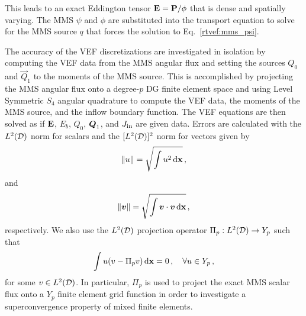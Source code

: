 \documentclass[../doc.tex]{subfiles}
\begin{document}
This leads to an exact Eddington tensor $\boldsymbol{\mathrm{E}} = \boldsymbol{\mathrm{P}}/\phi$ that is dense and spatially varying. The MMS $\psi$ and $\phi$ are substituted into the transport equation to solve for the MMS source $q$ that forces the solution to Eq.~\ref{rtvef:mms_psi}. 

The accuracy of the VEF discretizations are investigated in isolation by computing the VEF data from the MMS angular flux and setting the sources $Q_0$ and $\vec{Q}_1$ to the moments of the MMS source. This is accomplished by projecting the MMS angular flux onto a degree-$p$ DG finite element space and using Level Symmetric $S_4$ angular quadrature to compute the VEF data, the moments of the MMS source, and the inflow boundary function. The VEF equations are then solved as if $\boldsymbol{\mathrm{E}}$, $E_b$, $Q_0$, $\boldsymbol{Q}_1$, and $J_\text{in}$ are given data. Errors are calculated with the $L^2(\mathcal{D})$ norm for scalars and the $[L^2(\mathcal{D})]^2$ norm for vectors given by
	\begin{equation}
		\| u \| = \sqrt{\int u^2 \mathop{}\!\mathrm{d} \boldsymbol{\mathrm{x}}} \,,
	\end{equation}
and
	\begin{equation}
		\| \boldsymbol{v} \| = \sqrt{\int \boldsymbol{v}\cdot\boldsymbol{v} \mathop{}\!\mathrm{d} \boldsymbol{\mathrm{x}}}\,,
	\end{equation}
respectively. We also use the $L^2(\mathcal{D})$ projection operator $\Pi_p : L^2(\mathcal{D}) \rightarrow Y_p$ such that 
	\begin{equation}
		\int u(v - \Pi_p v) \mathop{}\!\mathrm{d} \boldsymbol{\mathrm{x}} = 0 \,, \quad \forall u \in Y_p \,, 
	\end{equation}
for some $v \in L^2(\mathcal{D})$. 
In particular, $\Pi_p$ is used to project the exact MMS scalar flux onto a $Y_p$ finite element grid function in order to investigate a superconvergence property of mixed finite elements. 
\end{document}
